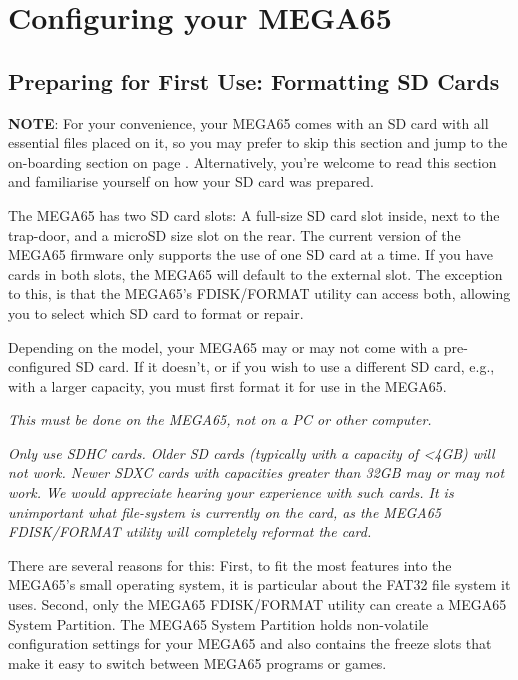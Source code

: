 \chapter{Configuring your MEGA65}
\label{cha:configuring}

\section{Preparing for First Use: Formatting SD Cards}

\textbf{NOTE}: For your convenience, your MEGA65 comes with an SD card with all essential 
files placed on it, so you may prefer to skip this section and jump to the on-boarding section 
on page \pageref{onboarding}. Alternatively, you're welcome to read this section and familiarise 
yourself on how your SD card was prepared.

The MEGA65 has two SD card slots: A full-size SD card slot inside, next to
the trap-door, and a microSD size slot on the rear.  The current version
of the MEGA65 firmware only supports the use of one SD card at a time.
If you have cards in both slots, the MEGA65 will default to the external slot. The exception to this, is that the MEGA65's FDISK/FORMAT
utility can access both, allowing you to select which SD card to format or
repair.

Depending on the model, your MEGA65 may or may not come with a pre-configured SD card. If it doesn't, or if you wish to use a different SD card, e.g., with a
larger capacity, you must first format it for use in the MEGA65.

{\em This must be done on the MEGA65, not on a PC or other computer.}

{\em Only use SDHC cards. Older SD cards (typically with
  a capacity of <4GB) will not work. Newer SDXC cards with
  capacities greater than 32GB may or may not work. We would
  appreciate hearing your experience with such cards. It is unimportant
  what file-system is currently on the card, as the MEGA65
  FDISK/FORMAT utility will completely reformat the card.}

There are several reasons for this: First, to fit the most
features into the MEGA65's small operating system, it is
particular about the FAT32 file system it uses. Second, only the
MEGA65 FDISK/FORMAT utility can create a MEGA65 System Partition. The
MEGA65 System Partition holds non-volatile configuration settings for
your MEGA65 and also contains the freeze slots that make it easy to
switch between MEGA65 programs or games.

